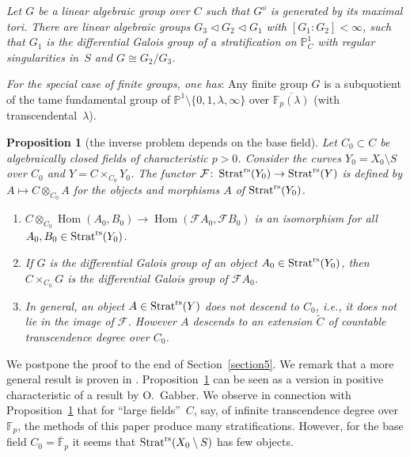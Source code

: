 \documentclass[pdftex]{sigma}
\numberwithin{equation}{section}
\newtheorem{Proposition}[Theorem]{Proposition}
\begin{document}
{\it Let $G$ be a linear algebraic group over $C$ such that $G^o$ is generated by its maximal tori. There are linear algebraic groups $G_3\lhd G_2\lhd G_1$ with $[G_ 1:G_2]< \infty$, such that $G_1$ is the differential Galois group of a stratification on $\mathbb{P}^1_C$ with regular singularities in~$S$ and $G\cong G_2/G_3$.

{\em For the special case of finite groups, one has}: Any finite group $G$ is a subquotient of the tame fundamental group of $\mathbb{P}^1\setminus \{0,1,\lambda ,\infty \}$ over $\overline{\mathbb{F}_p(\lambda )}$ (with transcendental~$\lambda$).}

\begin{Proposition}[the inverse problem depends on the base field]\label{1.1}
Let $C_0\subset C$ be algebraically closed fields of characteristic $p>0$. Consider the curves
$Y_0=X_0\setminus S$ over $C_0$ and $Y=C\times_{C_0}Y_0$. The functor $\mathcal{F}\colon \operatorname{Strat}^{\rm rs}(Y_0)\rightarrow \operatorname{Strat}^{\rm rs}(Y)$ is defined by $A\mapsto C\otimes_{C_0}A$ for the objects and morphisms $A$ of $\operatorname{Strat}^{\rm rs}(Y_0)$.
\begin{enumerate}\itemsep=0pt
\item[$(1)$] $C\otimes _{C_0}\operatorname{Hom}(A_0,B_0)\rightarrow \operatorname{Hom}(\mathcal{F}A_0,\mathcal{F}B_0)$ is an isomorphism for all $A_0,B_0\in \operatorname{Strat}^{\rm rs}(Y_0)$.
\item[$(2)$] If $G$ is the differential Galois group of an object $A_0\in \operatorname{Strat}^{\rm rs}(Y_0)$, then $C\times_{C_0}G$ is the differential Galois group of $\mathcal{F}A_0$.
\item[$(3)$] In general, an object $A\in \operatorname{Strat}^{\rm rs}(Y)$ does not descend to $C_0$, i.e., it does not lie in the image of $\mathcal{F}$. However $A$ descends to an extension $\tilde{C}$ of countable transcendence degree over $C_0$.
\end{enumerate}
\end{Proposition}

We postpone the proof to the end of Section~\ref{section5}. We remark that a more general result is proven in \cite{Ba}. Proposition~\ref{1.1} can be seen as a version in positive characteristic of a result \cite[Proposition~1.3.2]{Ka} by O.~Gabber. We observe in connection with Proposition~\ref{1.1} that for ``large fields''~$C$, say, of infinite
transcendence degree over~$\mathbb{F}_p$, the methods of this paper produce many stratifications. However, for the base field $C_0=\overline{\mathbb{F}}_p$ it seems that
$\operatorname{Strat}^{\rm rs}(X_0\setminus S)$ has few objects.
\end{document}
